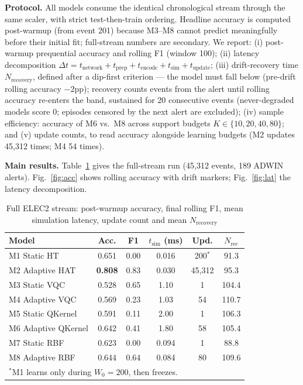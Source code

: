 \documentclass[conference]{IEEEtran}
\begin{document}
\textbf{Protocol.} All models consume the identical chronological stream through the same
scaler, with strict test-then-train ordering. Headline accuracy is computed post-warmup
(from event 201) because M3--M8 cannot predict meaningfully before their initial fit;
full-stream numbers are secondary. We report: (i) post-warmup prequential accuracy and
rolling F1 (window 100); (ii) latency decomposition
$\Delta t = t_{\text{network}} + t_{\text{prep}} + t_{\text{encode}} + t_{\text{sim}} +
t_{\text{update}}$; (iii) drift-recovery time $N_{\text{recovery}}$, defined after a
dip-first criterion --- the model must fall below (pre-drift rolling accuracy $- 2$pp);
recovery counts events from the alert until rolling accuracy re-enters the band,
sustained for 20 consecutive events (never-degraded models score 0; episodes censored by
the next alert are excluded); (iv) sample efficiency: accuracy of M6 vs.\ M8 across
support budgets $K \in \{10,20,40,80\}$; and (v) update counts, to read accuracy alongside
learning budgets (M2 updates 45{,}312 times; M4 54 times).

\textbf{Main results.} Table~\ref{tab:results} gives the full-stream run (45{,}312
events, 189 ADWIN alerts). Fig.~\ref{fig:acc} shows rolling accuracy with drift markers;
Fig.~\ref{fig:lat} the latency decomposition.

\begin{table}[t]
\centering
\caption{Full ELEC2 stream: post-warmup accuracy, final rolling F1, mean simulation
latency, update count and mean $N_{\text{recovery}}$}
\label{tab:results}
\footnotesize
\setlength{\tabcolsep}{3.5pt}
\begin{tabular}{@{}lccccc@{}}
\toprule
Model & Acc. & F1 & $t_{\text{sim}}$ (ms) & Upd. & $N_{\text{rec}}$ \\
\midrule
M1 Static HT        & 0.651 & 0.00 & 0.016 & 200$^{\ast}$ & 91.3 \\
M2 Adaptive HAT     & \textbf{0.808} & 0.83 & 0.030 & 45{,}312 & 95.3 \\
M3 Static VQC       & 0.528 & 0.65 & 1.10 & 1 & 104.4 \\
M4 Adaptive VQC     & 0.569 & 0.23 & 1.03 & 54 & 110.7 \\
M5 Static QKernel   & 0.591 & 0.11 & 2.00 & 1 & 106.3 \\
M6 Adaptive QKernel & 0.642 & 0.41 & 1.80 & 58 & 105.4 \\
M7 Static RBF       & 0.623 & 0.00 & 0.094 & 1 & 88.8 \\
M8 Adaptive RBF     & 0.644 & 0.64 & 0.084 & 80 & 109.6 \\
\bottomrule
\multicolumn{6}{l}{\footnotesize $^{\ast}$M1 learns only during $W_0 = 200$, then freezes.}
\end{tabular}
\end{table}
\end{document}

